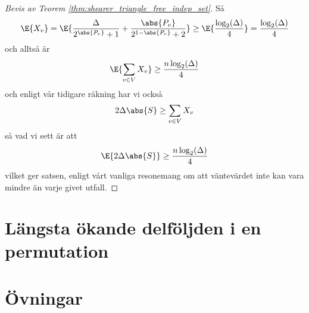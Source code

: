 \documentclass[nobib]{tufte-handout}
\begin{document}
\begin{proof}[Bevis av Teorem \ref{thm:shearer_triangle_free_indep_set}]
  Så
  \begin{align*}
    \E{X_v} = \E{\frac{\Delta}{2^{\abs{P_v}} + 1} + \frac{\abs{P_v}}{2^{1-\abs{P_v}} + 2}} \geq \E{\frac{\log_2(\Delta)}{4}} = \frac{\log_2(\Delta)}{4}
  \end{align*}
  och alltså är
  $$\E{\sum_{v \in V} X_v} \geq \frac{n\log_2(\Delta)}{4}$$
  och enligt vår tidigare räkning har vi också
  $$2\Delta\abs{S} \geq \sum_{v \in V} X_v$$
  så vad vi sett är att
  $$\E{2\Delta\abs{S}} \geq \frac{n\log_2(\Delta)}{4}$$
  vilket ger satsen, enligt vårt vanliga resonemang om att väntevärdet inte kan vara mindre än varje givet utfall.
\end{proof}

\section{Längsta ökande delföljden i en permutation}

\section{Övningar}


%
%
\end{document}
